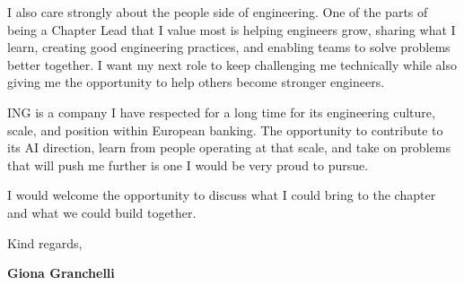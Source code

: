 \documentclass[11pt,a4paper]{article}
\begin{document}
I also care strongly about the people side of engineering. One of the parts of being a Chapter Lead that I value most is helping engineers grow, sharing what I learn, creating good engineering practices, and enabling teams to solve problems better together. I want my next role to keep challenging me technically while also giving me the opportunity to help others become stronger engineers.

ING is a company I have respected for a long time for its engineering culture, scale, and position within European banking. The opportunity to contribute to its AI direction, learn from people operating at that scale, and take on problems that will push me further is one I would be very proud to pursue.

I would welcome the opportunity to discuss what I could bring to the chapter and what we could build together.

Kind regards,

\textbf{Giona Granchelli}
\end{document}
